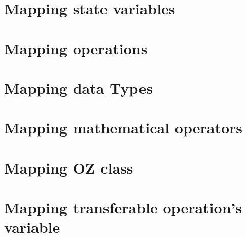 \section{Mapping state variables}
\label{sec_tra_mapping_state_variables}


\section{Mapping operations}
\label{sec_tra_mapping_operation}


\section{Mapping data Types}
\label{sec_tra_mapping_data_types}


\section{Mapping mathematical operators}
\label{sec_tra_mapping_mathematical_operations}



\section{Mapping OZ class}
\label{sec_tra_mapping_class}


\section{Mapping transferable operation's variable}
\label{sec_tra_mapping_transferable_operation}


